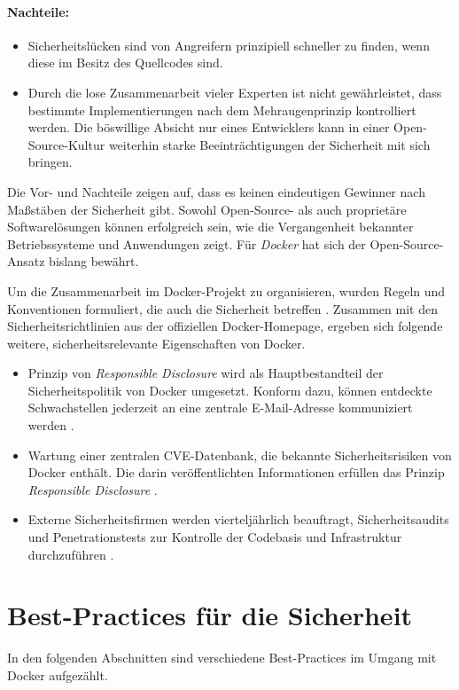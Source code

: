 \documentclass[../main.tex]{subfiles}
\begin{document}
    \paragraph{Nachteile:}
    \begin{itemize}
      \item Sicherheitslücken sind von Angreifern prinzipiell schneller zu finden, wenn diese im Besitz des Quellcodes sind.
      \item Durch die lose Zusammenarbeit vieler Experten ist nicht gewährleistet, dass bestimmte Implementierungen nach dem Mehraugenprinzip kontrolliert werden. Die böswillige Absicht nur eines Entwicklers kann in einer Open-Source-Kultur weiterhin starke Beeinträchtigungen der Sicherheit mit sich bringen.
    \end{itemize}

    Die Vor- und Nachteile zeigen auf, dass es keinen eindeutigen Gewinner nach Maßstäben der Sicherheit gibt. Sowohl Open-Source- als auch proprietäre Softwarelösungen können erfolgreich sein, wie die Vergangenheit bekannter Betriebssysteme und Anwendungen zeigt. Für \emph{Docker} hat sich der Open-Source-Ansatz bislang bewährt.

    Um die Zusammenarbeit im Docker-Projekt zu organisieren, wurden Regeln und Konventionen formuliert, die auch die Sicherheit betreffen \cite{githubDockerContribution}. Zusammen mit den Sicherheitsrichtlinien aus der offiziellen Docker-Homepage, ergeben sich folgende weitere, sicherheitsrelevante Eigenschaften von Docker.

    \begin{itemize}
      \item Prinzip von \emph{Responsible Disclosure} wird als Hauptbestandteil der Sicherheitspolitik von Docker umgesetzt. Konform dazu, können entdeckte Schwachstellen jederzeit an eine zentrale E-Mail-Adresse kommuniziert werden \cite{dockerSecurityPortal}.
      \item Wartung einer zentralen \acrshort{CVE}-Datenbank, die bekannte Sicherheitsrisiken von Docker enthält. Die darin veröffentlichten Informationen erfüllen das Prinzip \emph{Responsible Disclosure} \cite{dockerCVEList}.
      \item Externe Sicherheitsfirmen werden vierteljährlich beauftragt, Sicherheitsaudits und Penetrationstests zur Kontrolle der Codebasis und Infrastruktur durchzuführen \cite[S.5]{dockerSecIntro}.
    \end{itemize}

  \section{Best-Practices für die Sicherheit}
    In den folgenden Abschnitten sind verschiedene Best-Practices im Umgang mit Docker aufgezählt.
\end{document}
